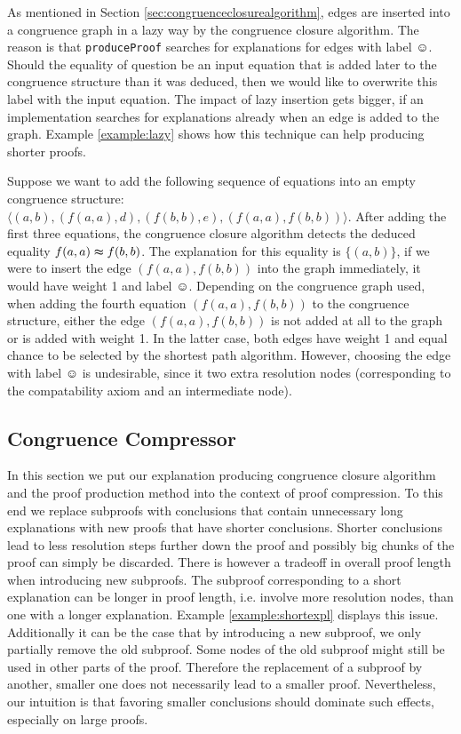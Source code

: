 As mentioned in Section \ref{sec:congruenceclosurealgorithm}, edges are inserted into a congruence graph in a lazy way by the congruence closure algorithm.
The reason is that \texttt{produceProof} searches for explanations for edges with label $\smiley$.
Should the equality of question be an input equation that is added later to the congruence structure than it was deduced, then we would like to overwrite this label with the input equation.
The impact of lazy insertion gets bigger, if an implementation searches for explanations already when an edge is added to the graph.
Example \ref{example:lazy} shows how this technique can help producing shorter proofs.

\begin{example}
\label{example:lazy}
Suppose we want to add the following sequence of equations into an empty congruence structure: $\langle (a,b),(f(a,a),d),(f(b,b),e),(f(a,a),f(b,b)) \rangle$.
After adding the first three equations, the congruence closure algorithm detects the deduced equality $f(a,a) \thickapprox f(b,b)$.
The explanation for this equality is $\{(a,b)\}$, if we were to insert the edge $(f(a,a),f(b,b))$ into the graph immediately, it would have weight 1 and label $\smiley$.
Depending on the congruence graph used, when adding the fourth equation $(f(a,a),f(b,b))$ to the congruence structure, either the edge $(f(a,a),f(b,b))$ is not added at all to the graph or is added with weight 1.
In the latter case, both edges have weight 1 and equal chance to be selected by the shortest path algorithm.
However, choosing the edge with label $\smiley$ is undesirable, since it two extra resolution nodes (corresponding to the compatability axiom and an intermediate node).

\end{example}

\FloatBarrier

\subsection*{Congruence Compressor}

In this section we put our explanation producing congruence closure algorithm and the proof production method into the context of proof compression.
To this end we replace subproofs with conclusions that contain unnecessary long explanations with new proofs that have shorter conclusions.
Shorter conclusions lead to less resolution steps further down the proof and possibly big chunks of the proof can simply be discarded.
There is however a tradeoff in overall proof length when introducing new subproofs.
The subproof corresponding to a short explanation can be longer in proof length, i.e. involve more resolution nodes, than one with a longer explanation.
Example \ref{example:shortexpl} displays this issue.
Additionally it can be the case that by introducing a new subproof, we only partially remove the old subproof.
Some nodes of the old subproof might still be used in other parts of the proof.
Therefore the replacement of a subproof by another, smaller one does not necessarily lead to a smaller proof.
Nevertheless, our intuition is that favoring smaller conclusions should dominate such effects, especially on large proofs.


